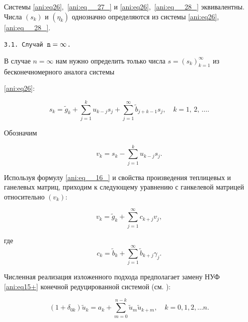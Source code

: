 \begin{lemma}

Системы \eqref{ani:eq26}$,$ \eqref{ani:eq__27_} и \eqref{ani:eq26}$,$ \eqref{ani:eq__28_} эквивалентны$.$ Числа $\left(s_{k}\right) $ и $\left(\eta _{k} \right)$ однозначно определяются из системы \rm \eqref{ani:eq26}, \eqref{ani:eq__28_}.

\end{lemma}



\smallskip



\texttt{3.1. Случай $\tt n=\infty$.}

В случае $n=\infty$ нам нужно определить только числа $s=\left(s_k\right)_{k=1}^\infty$ из бесконечномерного аналога системы 

\eqref{ani:eq26}:

 \begin{equation}\label{ani:eq29}

s_{k} =\tilde{g}_{k} +\sum\limits _{j=1}^{k}u_{k-j} s_{j} +\sum\limits _{j=1}^{\infty}\tilde{b}_{j+k-1} s_{j},\quad k=1,\, 2,\, \ldots .

\end{equation}

Обозначим

  \begin{equation*}

v_k=s_{k} -\sum\limits _{j=1}^{k}u_{k-j} s_{j} .

\end{equation*}



Используя формулу \eqref{ani:eq__16_} и свойства произведения теплицевых и ганелевых матриц, приходим к следующему уравнению с  ганкелевой матрицей  относительно $\left(v_k\right)$:

\begin{equation}\label{ani:eq30}

v_k=\tilde{g}_{k}+\sum\limits _{j=1}^{\infty}c_{k+j} v_{j},

\end{equation}

где $$c_k=\tilde{b}_k+\sum\limits_{j=1}^\infty \tilde{b}_{k+j}\gamma_j.$$



Численная реализация изложенного подхода предполагает замену НУФ \eqref{ani:eq15+} конечной редуцированной системой (см. \cite{ani:EnMn, ani:ArEn}):

 \begin{equation} 

 \label{ani:eq31} (1+\delta _{0k} )\tilde{u}_{k} =a_{k} +\sum\limits _{m=0}^{n-k }\tilde{u}_{m} \tilde{u}_{k+m}  ,

 \quad  k=0, 1, 2, \dots n. 

 \end{equation}



